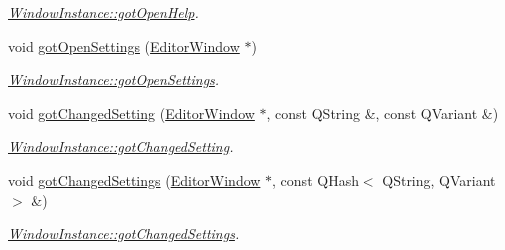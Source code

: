\begin{DoxyCompactItemize}
\begin{DoxyCompactList}\small\item\em \hyperlink{classInstances_1_1WindowInstance_ad1c5e3fc3c6f0675550786fb14f645a5}{Window\+Instance\+::got\+Open\+Help}. \end{DoxyCompactList}\item 
void \hyperlink{classInstances_1_1WindowInstance_a166bf08fb12fe133212bea23d8564a24}{got\+Open\+Settings} (\hyperlink{classEditorWindow}{Editor\+Window} $\ast$)
\begin{DoxyCompactList}\small\item\em \hyperlink{classInstances_1_1WindowInstance_a166bf08fb12fe133212bea23d8564a24}{Window\+Instance\+::got\+Open\+Settings}. \end{DoxyCompactList}\item 
void \hyperlink{classInstances_1_1WindowInstance_afe1550c9ad22f89ef9b9b0f2163fd4e3}{got\+Changed\+Setting} (\hyperlink{classEditorWindow}{Editor\+Window} $\ast$, const Q\+String \&, const Q\+Variant \&)
\begin{DoxyCompactList}\small\item\em \hyperlink{classInstances_1_1WindowInstance_afe1550c9ad22f89ef9b9b0f2163fd4e3}{Window\+Instance\+::got\+Changed\+Setting}. \end{DoxyCompactList}\item 
void \hyperlink{classInstances_1_1WindowInstance_acfa637305b9db11854e230a58e8d4fde}{got\+Changed\+Settings} (\hyperlink{classEditorWindow}{Editor\+Window} $\ast$, const Q\+Hash$<$ Q\+String, Q\+Variant $>$ \&)
\begin{DoxyCompactList}\small\item\em \hyperlink{classInstances_1_1WindowInstance_acfa637305b9db11854e230a58e8d4fde}{Window\+Instance\+::got\+Changed\+Settings}. \end{DoxyCompactList}\end{DoxyCompactItemize}
